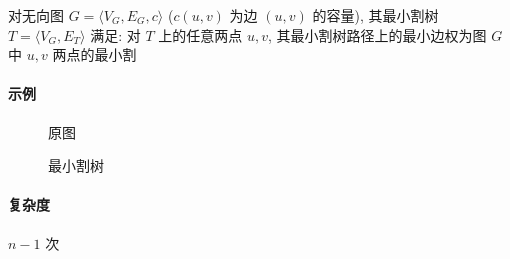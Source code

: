 对无向图 \(G=\langle V_G,E_G,c\rangle\) (\(c(u,v)\) 为边 \((u,v)\) 的容量), 其最小割树 \(T=\langle V_G,E_T\rangle\) 满足: 对 \(T\) 上的任意两点 \(u,v\), 其最小割树路径上的最小边权为图 \(G\) 中 \(u,v\) 两点的最小割

\paragraph{示例} \cite{enwiki:1187705852}

\begin{figure}[h]
    \label{img:gomory-hu-input}
    \centering
    
    \caption{原图}
\end{figure}

\begin{figure}[h]
    \label{img:gomory-hu-output}
    \centering
    
    \caption{最小割树}
\end{figure}

\paragraph{复杂度} \(n-1\) 次 
